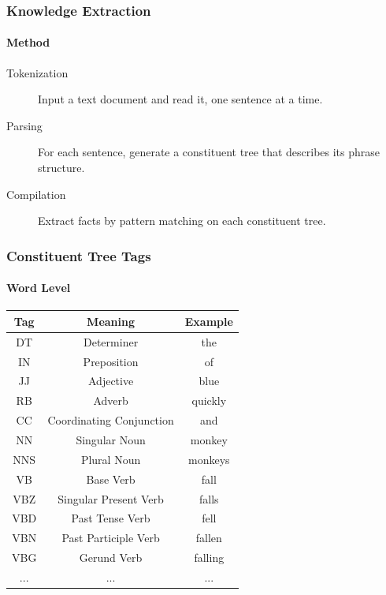 \documentclass[mathserif]{beamer}
\begin{document}
\begin{frame}

\frametitle{Knowledge Extraction}
\framesubtitle{Method}

\begin{description}

\item[Tokenization] Input a text document and read it, one sentence at a time.
\item[Parsing] For each sentence, generate a constituent tree that describes its phrase structure.
\item[Compilation] Extract facts by pattern matching on each constituent tree.

\end{description}

\end{frame}


\begin{frame}

\frametitle{Constituent Tree Tags}
\framesubtitle{Word Level}

\centering

\begin{tabular}{c | c | c}
Tag & Meaning & Example \\
\hline
DT & Determiner & the \\
IN & Preposition & of\\
JJ & Adjective & blue\\
RB & Adverb & quickly\\
CC & Coordinating Conjunction & and \\
NN & Singular Noun & monkey\\
NNS & Plural Noun & monkeys\\
VB & Base Verb & fall\\
VBZ & Singular Present Verb & falls\\
VBD & Past Tense Verb & fell\\
VBN & Past Participle Verb & fallen\\
VBG & Gerund Verb & falling\\
... & ... & ...\\
\end{tabular}

\end{frame}
\end{document}
